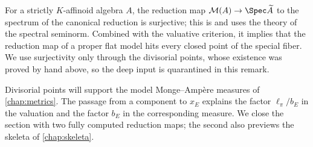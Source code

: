 \begin{remark}
\label{rem:berk-reduction-surjective}
For a strictly $K$-affinoid algebra $A$, the reduction map
$\mathcal M(A)\to\Spec\widetilde A$ to the spectrum of the canonical
reduction is surjective; this is \cite[Proposition~2.4.4]{Berk12} and
uses the theory of the spectral seminorm.  Combined with the valuative
criterion, it implies that the reduction map of a proper flat model hits
every closed point of the special fiber.  We use surjectivity only
through the divisorial points, whose existence was proved by hand above,
so the deep input is quarantined in this remark.
\end{remark}

Divisorial points will support the model Monge--Amp\`ere measures of
\cref{chap:metrics}. The passage from a component to $x_E$ explains the factor
$\ell_\pi/b_E$ in the valuation and the factor $b_E$ in the corresponding
measure.  We close the section with two fully computed reduction maps;
the second also previews the skeleta of \cref{chap:skeleta}.

